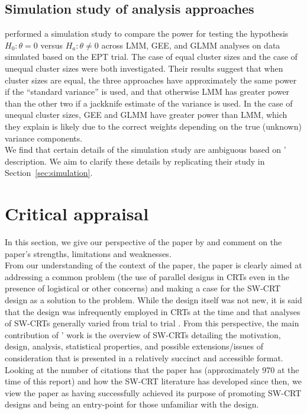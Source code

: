 \documentclass[10pt]{article}
\begin{document}
\subsection{Simulation study of analysis approaches}

\textcite{Hussey:2007} performed a simulation study to compare the power for testing the hypothesis $H_0:\theta=0$ versus $H_a:\theta\neq0$ across LMM, GEE, and GLMM analyses on data simulated based on the EPT trial. The case of equal cluster sizes and the case of unequal cluster sizes were both investigated. Their results suggest that when cluster sizes are equal, the three approaches have approximately the same power  if the ``standard variance'' is used, and that otherwise LMM has greater power than the other two if a jackknife estimate of the variance is used. In the case of unequal cluster sizes, GEE and GLMM have greater power than LMM, which they explain is likely due to the correct weights depending on the true (unknown) variance components.
\\

We find that certain details of the simulation study are ambiguous based on \citeauthor{Hussey:2007}' description. We aim to clarify these details by replicating their study in Section~\ref{sec:simulation}.


\section{Critical appraisal} \label{sec:critique}

In this section, we give our perspective of the paper by \textcite{Hussey:2007} and comment on the paper's strengths, limitations and weaknesses.
\\

From our understanding of the context of the paper, the paper is clearly aimed at addressing a common problem (the use of parallel designs in CRTs even in the presence of logistical or other concerns) and making a case for the SW-CRT design as a solution to the problem. While the design itself was not new, it is said that the design was infrequently employed in CRTs at the time and that analyses of SW-CRTs generally varied from trial to trial \parencite{Brown:2006}. From this perspective, the main contribution of \citeauthor{Hussey:2007}' work is the overview of SW-CRTs detailing the motivation, design, analysis, statistical properties, and possible extensions/issues of consideration that is presented in a relatively succinct and accessible format. Looking at the number of citations that the paper has (approximately 970 at the time of this report) and how the SW-CRT literature has developed since then, we view the paper as having successfully achieved its purpose of promoting SW-CRT designs and being an entry-point for those unfamiliar with the design.
\\
\end{document}
